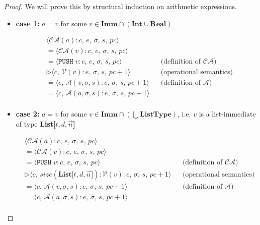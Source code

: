 \documentclass{article}
\begin{document}
\begin{proof}
We will prove this by structural induction on arithmetic expressions.

\begin{itemize}
    \item \textbf{case 1: } $a = v$ for some $v \in \textbf{Imm} \cap (\textbf{Int} \cup \textbf{Real})$

    \[
      \begin{aligned}
        &\langle  \mathcal{CA}(a) : c,\, e,\, \sigma,\, s,\, pc \rangle \\
        &= \langle \mathcal{CA}(v) : c,\, e,\, \sigma,\, s,\, pc \rangle \\
        &= \langle \texttt{PUSH}\;v   : c,\, e,\, \sigma,\, s,\, pc \rangle 
        && \text{(definition of } \mathcal{CA}\text{)} \\
        &\triangleright \langle c,\, \mathcal{V}(v) : e,\, \sigma,\, s,\, pc+1 \rangle 
        && \text{(operational semantics)} \\
        &= \langle c,\, \mathcal{A}(v, \sigma, s) : e,\, \sigma,\, s,\, pc+1 \rangle 
        && \text{(definition of } \mathcal{A}\text{)} \\
        &= \langle c,\, \mathcal{A}(a, \sigma, s) : e,\, \sigma,\, s,\, pc+1 \rangle \\
      \end{aligned}
  \]

  \item \textbf{case 2: } $a = v$ for some $v \in \textbf{Imm} \cap (\bigcup \textbf{ListType})$, i.e. $v$ is a list-immediate of type \textbf{List[$t, d, \vec{n}$]}

    \[
      \begin{aligned}
        &\langle  \mathcal{CA}(a) : c,\, e,\, \sigma,\, s,\, pc \rangle \\
        &= \langle \mathcal{CA}(v) : c,\, e,\, \sigma,\, s,\, pc \rangle \\
        &= \langle \texttt{PUSH}\;v   : c,\, e,\, \sigma,\, s,\, pc \rangle 
        && \text{(definition of } \mathcal{CA}\text{)} \\
        &\triangleright \langle c,\, size(\textbf{List[$t, d, \vec{n}$]}) : \mathcal{V}(v) : e,\, \sigma,\, s,\, pc+1 \rangle 
        && \text{(operational semantics)} \\
        &= \langle c,\, \mathcal{A}(v, \sigma, s) : e,\, \sigma,\, s,\, pc+1 \rangle 
        && \text{(definition of } \mathcal{A}\text{)} \\
        &= \langle c,\, \mathcal{A}(a, \sigma, s) : e,\, \sigma,\, s,\, pc+1 \rangle \\
      \end{aligned}
  \]


\end{itemize}
\end{proof}
\end{document}
